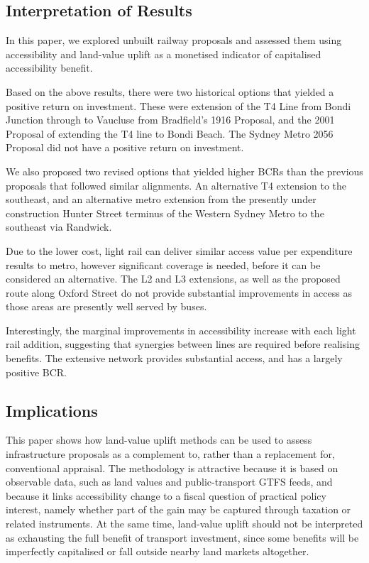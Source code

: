 \documentclass[preprint,12pt,authoryear]{elsarticle}
\begin{document}
\subsection{Interpretation of Results}

{In this paper, we explored unbuilt railway proposals and assessed them using accessibility and land-value uplift as a monetised indicator of capitalised accessibility benefit.}

Based on the above results, there were two historical options that yielded a positive return on investment. These were  extension of the T4 Line from Bondi Junction through to Vaucluse from Bradfield's 1916  Proposal, and the 2001 Proposal of extending the T4 line to Bondi Beach. The Sydney Metro 2056 Proposal did not have a positive return on investment. 



We also proposed two revised options that yielded higher BCRs than the previous proposals that followed similar alignments. An alternative T4 extension to the southeast, and an alternative metro extension from the presently under construction Hunter Street terminus of the Western Sydney Metro to the southeast via Randwick. 

Due to the lower cost, light rail can deliver similar access value per expenditure results to metro, however significant coverage is needed, before it can be considered an alternative. The L2 and L3 extensions, as well as the proposed route along Oxford Street do not provide substantial improvements in access as those areas are presently well served by buses. 

Interestingly, the marginal improvements in accessibility increase with each light rail addition, suggesting that synergies between lines are required before realising benefits. The extensive network provides substantial access, and has a largely positive BCR.





\subsection{Implications}


{This paper shows how land-value uplift methods can be used to assess infrastructure proposals as a complement to, rather than a replacement for, conventional appraisal. The methodology is attractive because it is based on observable data, such as land values and public-transport GTFS feeds, and because it links accessibility change to a fiscal question of practical policy interest, namely whether part of the gain may be captured through taxation or related instruments. At the same time, land-value uplift should not be interpreted as exhausting the full benefit of transport investment, since some benefits will be imperfectly capitalised or fall outside nearby land markets altogether.}
\end{document}
